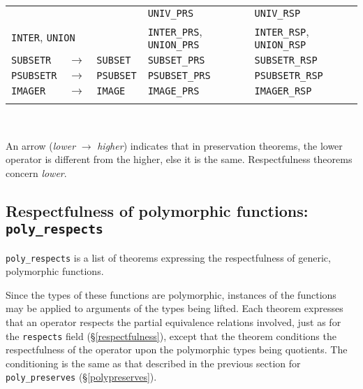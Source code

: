 \documentclass[envcountsame,runningheads]{llncs}
\newcommand{\quotient}{partial equivalence}
\begin{document}
\begin{table}
\begin{center}
\begin{tabular}{|lll|l|l|}
\begin{comment}
{\tt UNIV} & & & {\tt UNIV\_PRS} & {\tt UNIV\_RSP} \\
\multicolumn{3}{|l|}{{\tt INTER}, {\tt UNION}}
  & {\tt INTER\_PRS}, {\tt UNION\_PRS} & {\tt INTER\_RSP}, {\tt UNION\_RSP} \\
{\tt SUBSETR} & $\rightarrow$ & {\tt SUBSET}
& {\tt SUBSET\_PRS} & {\tt SUBSETR\_RSP} \\
{\tt PSUBSETR} & $\rightarrow$ & {\tt PSUBSET}
& {\tt PSUBSET\_PRS} & {\tt PSUBSETR\_RSP} \\
{\tt IMAGER} & $\rightarrow$ & {\tt IMAGE}
& {\tt IMAGE\_PRS} & {\tt IMAGER\_RSP} \\
\end{comment}
\\
\hline
\end{tabular}
\\
\end{center}
An arrow
({\it lower} $\rightarrow$ {\it higher})
indicates that in
preservation theorems,
the lower operator
is different
from the higher,
else
it
is the same.
Respectfulness theorems concern
{\it lower}.
\end{table}

%
\subsection{Respectfulness of polymorphic functions: {\tt poly\_respects}}
%
\label{polyrespects}

{\tt poly\_respects} is a list of theorems expressing the
respectfulness of generic, polymorphic functions.

Since the types of
these functions are polymorphic, instances of the functions may be applied
to arguments of the types being lifted.
Each theorem expresses
that an operator respects the \quotient{} relations involved, just as
for the {\tt respects} field (\S\ref{respectfulness}),
except that the theorem conditions
the respectfulness of the operator upon the polymorphic types being
quotients.  The conditioning is the same as that described
in the previous section
for {\tt poly\_preserves} (\S\ref{polypreserves}).
\end{document}
